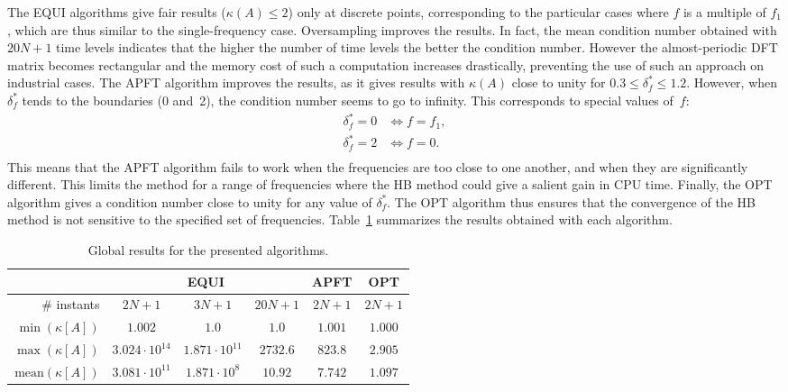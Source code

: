 The EQUI algorithms give fair results ($\kappa(A) \leq 2$) only at
discrete points, corresponding to the particular cases where $f$ is a
multiple of $f_1$, which are thus similar to the single-frequency
case. Oversampling improves the results. In fact, the mean condition number obtained
with $20N + 1$ time levels indicates that the higher the number of time levels
the better the condition number. However the almost-periodic DFT
matrix becomes rectangular and the memory cost of such a computation
increases drastically, preventing the use of such an approach on industrial cases. The APFT
algorithm improves the results, as it gives results with $\kappa ( A
)$ close to unity for $0.3 \leq \delta_f^* \leq 1.2$. However, when
$\delta_f^*$ tends to the boundaries (0 and~2), the condition
number seems to go to infinity. This corresponds to special values
of~$f$:
\begin{equation}
  \begin{split}
    \delta_f^* = 0 & \iff f = f_1, \\
    \delta_f^* = 2 & \iff f = 0. \\
  \end{split}
  \label{eq:singularities}
\end{equation}
This means that the APFT algorithm fails to work when the frequencies
are too close to one another, and when they are significantly
different.  This limits the method for a range of frequencies where
the HB method could give a salient gain in CPU time.
Finally, the OPT algorithm gives a condition number close to unity for
any value of $\delta_f^*$. The OPT algorithm thus ensures that the
convergence of the HB method is not sensitive to the specified set of
frequencies. Table~\ref{tab:algo_sum} summarizes the results obtained
with each algorithm.
\begin{table}[htb]
  \centering
  \begin{tabular}{|r|*{5}{c|}}
    \hline
    & \multicolumn{3}{c|}{EQUI} & APFT & OPT\\
    \hline
    \# instants & $2N+1$ & $3N+1$ & $20N+1$ & $2N+1$ & $2N+1$ \\
    \hline
    \hline
    $\min \left( \kappa \left[A\right]\right) $ & $1.002$ & $1.0$ & $1.0$ & $1.001$ & $1.000$ \\
    \hline
    $\max \left( \kappa \left[A\right]\right) $ & $3.024\cdot 10^{14}$ & $1.871\cdot 10^{11}$ & $2732.6$ & $823.8$ & $2.905$ \\
    \hline
    $\textrm{mean} \left( \kappa \left[A\right]\right) $ & $3.081\cdot 10^{11}$ & $1.871\cdot 10^{8}$ & $10.92$ & $7.742$ & $1.097$ \\
    \hline
  \end{tabular}
\caption{Global results for the presented algorithms.}
\label{tab:algo_sum}
\end{table} 

